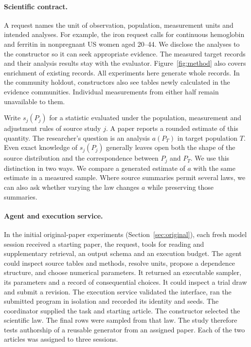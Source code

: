 \documentclass[sigconf,anonymous,review]{acmart}
\begin{document}
\paragraph{Scientific contract.}
A request names the unit of observation, population, measurement units and intended analyses. For example, the iron request calls for continuous hemoglobin and ferritin in nonpregnant US women aged 20--44. We disclose the analyses to the constructor so it can seek appropriate evidence. The measured target records and their analysis results stay with the evaluator. Figure~\ref{fig:method} also covers enrichment of existing records. All experiments here generate whole records. In the community holdout, constructors also see tables newly calculated in the evidence communities. Individual measurements from either half remain unavailable to them.

Write $s_j(P_j)$ for a statistic evaluated under the population, measurement and adjustment rules of source study $j$. A paper reports a rounded estimate of this quantity. The researcher's question is an analysis $a(P_T)$ in target population $T$. Even exact knowledge of $s_j(P_j)$ generally leaves open both the shape of the source distribution and the correspondence between $P_j$ and $P_T$. We use this distinction in two ways. We compare a generated estimate of $a$ with the same estimate in a measured sample. Where source summaries permit several laws, we can also ask whether varying the law changes $a$ while preserving those summaries.

\paragraph{Agent and execution service.}
In the initial original-paper experiments (Section~\ref{sec:original}), each fresh model session received a starting paper, the request, tools for reading and supplementary retrieval, an output schema and an execution budget. The agent could inspect source tables and methods, resolve units, propose a dependence structure, and choose numerical parameters. It returned an executable sampler, its parameters and a record of consequential choices. It could inspect a trial draw and submit a revision. The execution service validated the interface, ran the submitted program in isolation and recorded its identity and seeds. The coordinator supplied the task and starting article. The constructor selected the scientific law. The final rows were sampled from that law. The study therefore tests authorship of a reusable generator from an assigned paper. Each of the two articles was assigned to three sessions.
\end{document}
